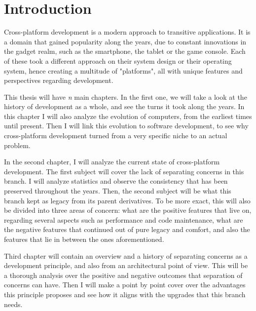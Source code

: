 \chapter{Introduction}

\label{intro}


Cross-platform development is a modern approach to transitive applications.
It is a domain that gained popularity along the years, due to constant innovations in the gadget realm, such as the smartphone, the tablet or the game console.
Each of these took a different approach on their system design or their operating system, hence creating a multitude of "platforms", all with unique features and perspectives regarding development.

\par
This thesis will have \textit{n} main chapters.
In the first one, we will take a look at the history of development as a whole, and see the turns it took along the years.
In this chapter I will also analyze the evolution of computers, from the earliest times until present.
Then I will link this evolution to software development, to see why cross-platform development turned from a very specific niche to an actual problem.

\par
In the second chapter, I will analyze the current state of cross-platform development.
The first subject will cover the lack of separating concerns in this branch.
I will analyze statistics and observe the consistency that has been preserved throughout the years.
Then, the second subject will be what this branch kept as legacy from its parent derivatives.
To be more exact, this will also be divided into three areas of concern: what are the positive features that live on, regarding several aspects such as performance and code maintenance, what are the negative features that continued out of pure legacy and comfort, and also the features that lie in between the ones aforementioned.

\par
Third chapter will contain an overview and a history of separating concerns as a development principle, and also from an architectural point of view.
This will be a thorough analysis over the positive and negative outcomes that separation of concerns can have.
Then I will make a point by point cover over the advantages this principle proposes and see how it aligns with the upgrades that this branch needs.

